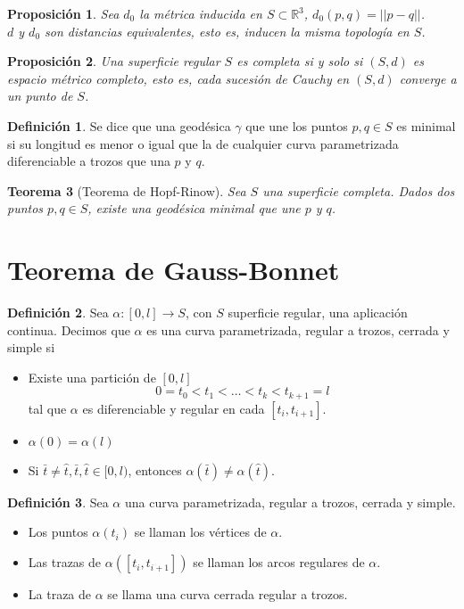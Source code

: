 \documentclass{report}
\newtheorem{theorem}{Teorema}[chapter]
\newtheorem{proposition}[theorem]{Proposición}
\theoremstyle{remark}
\theoremstyle{remark}
\theoremstyle{definition}
\newtheorem{definition}{Definición}[chapter]
\theoremstyle{definition}
\theoremstyle{definition}
\begin{document}
\begin{proposition}
    Sea $d_0$ la métrica inducida en $S \subset \mathbb{R}^3$, $d_0(p, q) = ||p-q||$.\\
    $d$ y $d_0$ son distancias equivalentes, esto es, inducen la misma topología en $S$.
\end{proposition}

\begin{proposition}
    Una superficie regular $S$ es completa si y solo si $(S, d)$ es espacio métrico completo, esto es, cada sucesión de Cauchy en $(S, d)$ converge a un punto de $S$.
\end{proposition}

\begin{definition}
    Se dice que una geodésica $\gamma$ que une los puntos $p, q \in S$ es minimal si su longitud es menor o igual que la de cualquier curva parametrizada diferenciable a trozos que una $p$ y $q$.
\end{definition}

\begin{theorem}[Teorema de Hopf-Rinow]
    Sea $S$ una superficie completa.
    Dados dos puntos $p, q \in S$, existe una geodésica minimal que une $p$ y $q$.
\end{theorem}

\section{Teorema de Gauss-Bonnet}

\begin{definition}
    Sea $\alpha: [0, l] \to S$, con $S$ superficie regular, una aplicación continua.
    Decimos que $\alpha$ es una curva parametrizada, regular a trozos, cerrada y simple si
    \begin{itemize}
        \item Existe una partición de $[0, l]$
              $$0 = t_0 < t_1 < \dots < t_k < t_{k+1} = l$$
              tal que $\alpha$ es diferenciable y regular en cada $[t_i, t_{i+1}]$.
        \item $\alpha(0) = \alpha(l)$
        \item Si $\bar{t} \neq \hat{t}, \bar{t}, \hat{t} \in [0, l)$, entonces $\alpha(\bar{t}) \neq \alpha(\hat{t})$.
    \end{itemize}
\end{definition}

\begin{definition}
    Sea $\alpha$ una curva parametrizada, regular a trozos, cerrada y simple.
    \begin{itemize}
        \item Los puntos $\alpha(t_i)$ se llaman los vértices de $\alpha$.
        \item Las trazas de $\alpha([t_i, t_{i+1}])$ se llaman los arcos regulares de $\alpha$.
        \item La traza de $\alpha$ se llama una curva cerrada regular a trozos.
    \end{itemize}
\end{definition}
\end{document}

